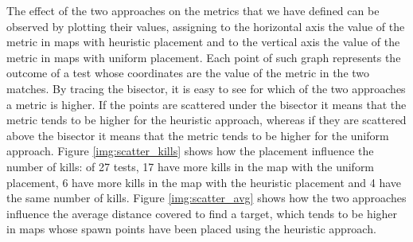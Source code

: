 The effect of the two approaches on the metrics that we have defined can be observed by plotting their values, assigning to the horizontal axis the value of the metric in maps with heuristic placement and to the vertical axis the value of the metric in maps with uniform placement. Each point of such graph represents the outcome of a test whose coordinates are the value of the metric in the two matches. By tracing the bisector, it is easy to see for which of the two approaches a metric is higher. If the points are scattered under the bisector it means that the metric tends to be higher for the heuristic approach, whereas if they are scattered above the bisector it means that the metric tends to be higher for the uniform approach. Figure \ref{img:scatter_kills} shows how the placement influence the number of kills: of 27 tests, 17 have more kills in the map with the uniform placement, 6 have more kills in the map with the heuristic placement and 4 have the same number of kills. Figure \ref{img:scatter_avg} shows how the two approaches influence the average distance covered to find a target, which tends to be higher in maps whose spawn points have been placed using the heuristic approach.

\par

